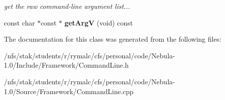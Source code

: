 \begin{DoxyCompactItemize}
\begin{DoxyCompactList}\small\item\em get the raw command-\/line argument list... \item\end{DoxyCompactList}\item 
\hypertarget{classSampleFramework_1_1SampleCommandLine_a90cbc190290ab2bb9462956f88a22267}{
const char $\ast$const $\ast$ {\bfseries getArgV} (void) const }
\label{classSampleFramework_1_1SampleCommandLine_a90cbc190290ab2bb9462956f88a22267}

\end{DoxyCompactItemize}


The documentation for this class was generated from the following files:\begin{DoxyCompactItemize}
\item 
/nfs/stak/students/r/rymalc/cfs/personal/code/Nebula-\/1.0/Include/Framework/CommandLine.h\item 
/nfs/stak/students/r/rymalc/cfs/personal/code/Nebula-\/1.0/Source/Framework/CommandLine.cpp\end{DoxyCompactItemize}
